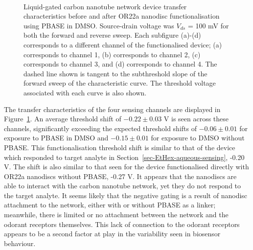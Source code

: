 \documentclass[
  a4paper,
]{scrbook}
\begin{document}
\begin{figure}
\begin{minipage}[t]{0.45\linewidth}
{{}

}

\end{minipage}%
%
\begin{minipage}[t]{0.01\linewidth}

{\centering 

~

}

\end{minipage}%

\caption{\label{fig-DMSO-TX}Liquid-gated carbon nanotube network device
transfer characteristics before and after OR22a nanodisc
functionalisation using PBASE in DMSO. Source-drain voltage was
\(V_{ds}\) = 100 mV for both the forward and reverse sweep. Each
subfigure (a)-(d) corresponds to a different channel of the
functionalised device; (a) corresponds to channel 1, (b) corresponds to
channel 2, (c) corresponds to channel 3, and (d) corresponds to channel
4. The dashed line shown is tangent to the subthreshold slope of the
forward sweep of the characteristic curve. The threshold voltage
associated with each curve is also shown.}

\end{figure}

The transfer characteristics of the four sensing channels are displayed
in Figure~\ref{fig-DMSO-TX}. An average threshold shift of
\(-0.22\pm0.03\) V is seen across these channels, significantly
exceeding the expected threshold shifts of \(-0.06\pm0.01\) for exposure
to PBASE in DMSO and \(-0.15\pm0.01\) for exposure to DMSO without
PBASE. This functionalisation threshold shift is similar to that of the
device which responded to target analyte in
Section~\ref{sec-EtHex-aqueous-sensing}, -0.20 V. The shift is also
similar to that seen for the device functionalised directly with OR22a
nanodiscs without PBASE, -0.27 V. It appears that the nanodiscs are able
to interact with the carbon nanotube network, yet they do not respond to
the target analyte. It seems likely that the negative gating is a result
of nanodisc attachment to the network, either with or without PBASE as a
linker; meanwhile, there is limited or no attachment between the network
and the odorant receptors themselves. This lack of connection to the
odorant receptors appears to be a second factor at play in the
variability seen in biosensor behaviour.
\end{document}
